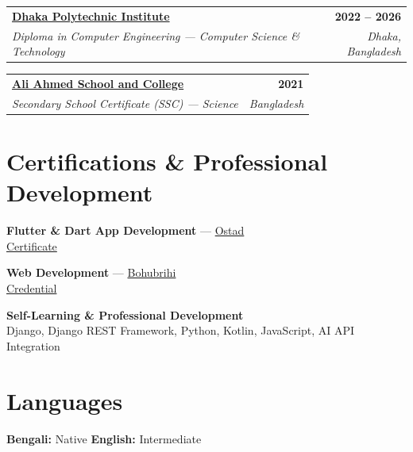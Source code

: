 \documentclass[10.5pt, a4paper]{article}
\makeatletter
\newcommand{\eduentry}[4]{%
  \begin{tabularx}{\linewidth}{@{}X r@{}}
    \textbf{#1} & \textbf{\small\color{cnavy}#2} \\[1pt]
    \textit{\small\color{csteel}#3} & \textit{\small\color{csteel}#4}
  \end{tabularx}%
}
\makeatother
\begin{document}
\eduentry{\href{https://dhaka.polytech.gov.bd/}{Dhaka Polytechnic Institute}}{2022 -- 2026}{Diploma in Computer Engineering --- Computer Science \& Technology}{Dhaka, Bangladesh}

\vspace{6pt}

\eduentry{\href{http://aasac.edu.bd/}{Ali Ahmed School and College}}{2021}{Secondary School Certificate (SSC) --- Science}{Bangladesh}

\section{Certifications \& Professional Development}

\textbf{Flutter \& Dart App Development} --- \href{https://ostad.app/}{Ostad} \\
\href{https://ostad.app/share/certificate/c43942-md-saidur-rahman-bhuyan}{Certificate}

\vspace{5pt}

\textbf{Web Development} --- \href{https://bohubrihi.com/}{Bohubrihi} \\
\href{https://www.linkedin.com/in/saidur1004/overlay/Certifications/132641588/treasury/?profileId=ACoAAFvw44EBd0KjHnbL5Xfk4zXY-laSdkRnl2E}{Credential}

\vspace{5pt}

\textbf{Self-Learning \& Professional Development} \\
Django, Django REST Framework, Python, Kotlin, JavaScript, AI API Integration

\section{Languages}

\vspace{2pt}
{\small
\textbf{Bengali:} Native
\quad\textbullet\quad
\textbf{English:} Intermediate
}
\end{document}
